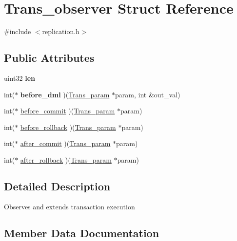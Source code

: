 \hypertarget{structTrans__observer}{}\section{Trans\+\_\+observer Struct Reference}
\label{structTrans__observer}


{\ttfamily \#include $<$replication.\+h$>$}

\subsection*{Public Attributes}
\begin{DoxyCompactItemize}
\item 
\mbox{\label{structTrans__observer_abbbdcd4305524ef6ffc2a0514572a667}} 
uint32 {\bfseries len}
\item 
\mbox{\label{structTrans__observer_aa72e0e7ecf684817fbade7cabb322f7e}} 
int($\ast$ {\bfseries before\+\_\+dml} )(\mbox{\hyperlink{structTrans__param}{Trans\+\_\+param}} $\ast$param, int \&out\+\_\+val)
\item 
int($\ast$ \mbox{\hyperlink{structTrans__observer_a9c5b093bbc5a164c12af395e92307a99}{before\+\_\+commit}} )(\mbox{\hyperlink{structTrans__param}{Trans\+\_\+param}} $\ast$param)
\item 
int($\ast$ \mbox{\hyperlink{structTrans__observer_a474b3fcc2624e19bb1718b8733fe1834}{before\+\_\+rollback}} )(\mbox{\hyperlink{structTrans__param}{Trans\+\_\+param}} $\ast$param)
\item 
int($\ast$ \mbox{\hyperlink{structTrans__observer_a770f4b7f2f70422a98fb53d87946028e}{after\+\_\+commit}} )(\mbox{\hyperlink{structTrans__param}{Trans\+\_\+param}} $\ast$param)
\item 
int($\ast$ \mbox{\hyperlink{structTrans__observer_aab173ceafec6271f6fcde43c32522306}{after\+\_\+rollback}} )(\mbox{\hyperlink{structTrans__param}{Trans\+\_\+param}} $\ast$param)
\end{DoxyCompactItemize}


\subsection{Detailed Description}
Observes and extends transaction execution 

\subsection{Member Data Documentation}
\mbox{\label{structTrans__observer_a770f4b7f2f70422a98fb53d87946028e}} 
